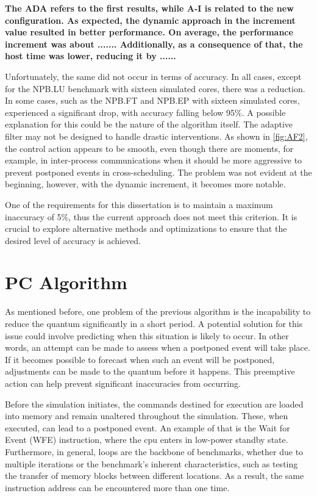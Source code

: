 \textbf{The ADA refers to the first results, while A-I is related to the new configuration. As expected, the dynamic approach in the increment value resulted in better performance. On average, the performance increment was about ....... Additionally, as a consequence of that, the host time was lower, reducing it by ...... }

Unfortunately, the same did not occur in terms of accuracy. In all cases, except for the NPB.LU benchmark with sixteen simulated cores, there was a reduction. In some cases, such as the NPB.FT and NPB.EP with sixteen simulated cores, experienced a significant drop, with accuracy falling below 95\%. A possible explanation for this could be the nature of the algorithm itself. The adaptive filter may not be designed to handle drastic interventions. As shown in \autoref{fig:AF2}, the control action appears to be smooth, even though there are moments, for example, in inter-process communications when it should be more aggressive to prevent postponed events in cross-scheduling. The problem was not evident at the beginning, however, with the dynamic increment, it becomes more notable. 

One of the requirements for this dissertation is to maintain a maximum inaccuracy of 5\%, thus the current approach does not meet this criterion. It is crucial to explore alternative methods and optimizations to ensure that the desired level of accuracy is achieved.

\section{PC Algorithm}

As mentioned before, one problem of the previous algorithm is the incapability to reduce the quantum significantly in a short period. A potential solution for this issue could involve predicting when this situation is likely to occur. In other words, an attempt can be made to assess when a postponed event will take place. If it becomes possible to forecast when such an event will be postponed, adjustments can be made to the quantum before it happens. This preemptive action can help prevent significant inaccuracies from occurring. 

Before the simulation initiates, the commands destined for execution are loaded into memory and remain unaltered throughout the simulation. These, when executed, can lead to a postponed event. An example of that is the Wait for Event (WFE) instruction, where the \gls{cpu} enters in low-power standby state. Furthermore, in general, loops are the backbone of benchmarks, whether due to multiple iterations or the benchmark's inherent characteristics, such as testing the transfer of memory blocks between different locations. As a result, the same instruction address can be encountered more than one time. 

